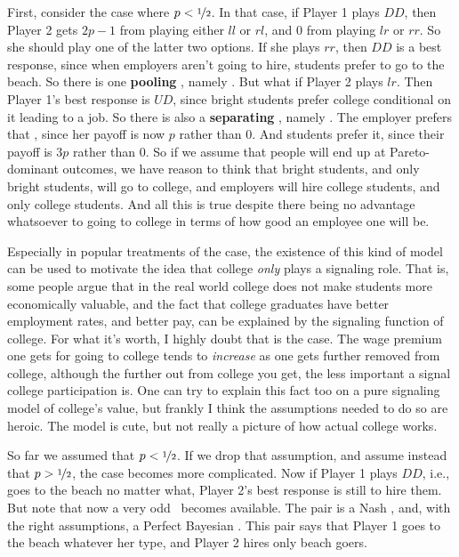 First, consider the case where $p < \nicefrac{1}{2}$. In that case, if Player 1 plays $DD$, then Player 2 gets $2p-1$ from playing either $ll$ or $rl$, and 0 from playing $lr$ or $rr$. So she should play one of the latter two options. If she plays $rr$, then $DD$ is a best response, since when employers aren't going to hire, students prefer to go to the beach. So there is one \textbf{pooling} \eqm, namely . But what if Player 2 plays $lr$. Then Player 1's best response is $UD$, since bright students prefer college conditional on it leading to a job. So there is also a \textbf{separating} \eqm, namely . The employer prefers that \eqm, since her payoff is now $p$ rather than 0. And students prefer it, since their payoff is $3p$ rather than 0. So if we assume that people will end up at Pareto-dominant outcomes, we have reason to think that bright students, and only bright students, will go to college, and employers will hire college students, and only college students. And all this is true despite there being no advantage whatsoever to going to college in terms of how good an employee one will be.

Especially in popular treatments of the case, the existence of this kind of model can be used to motivate the idea that college \textit{only} plays a signaling role. That is, some people argue that in the real world college does not make students more economically valuable, and the fact that college graduates have better employment rates, and better pay, can be explained by the signaling function of college. For what it's worth, I highly doubt that is the case. The wage premium one gets for going to college tends to \textit{increase} as one gets further removed from college, although the further out from college you get, the less important a signal college participation is. One can try to explain this fact too on a pure signaling model of college's value, but frankly I think the assumptions needed to do so are heroic. The model is cute, but not really a picture of how actual college works.

So far we assumed that $p < \nicefrac{1}{2}$. If we drop that assumption, and assume instead that $p > \nicefrac{1}{2}$, the case becomes more complicated. Now if Player 1 plays $DD$, i.e., goes to the beach no matter what, Player 2's best response is still to hire them. But note that now a very odd \eqm\ becomes available. The pair  is a Nash \eqm, and, with the right assumptions, a Perfect Bayesian \eqm. This pair says that Player 1 goes to the beach whatever her type, and Player 2 hires only beach goers.

